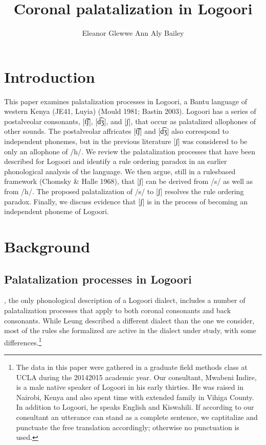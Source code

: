 \documentclass[output=paper]{langsci/langscibook}
\title{Coronal palatalization in Logoori}
\author{%
 Eleanor Glewwe\affiliation{University of California, Los Angeles}\lastand 
 Ann Aly Bailey \affiliation{University of California, Los Angeles}
}
\begin{document}
 



\section{Introduction}

This paper examines palatalization processes in Logoori, a Bantu language of western Kenya (JE41, Luyia) (Mould 1981; Bastin 2003). Logoori has a series of postalveolar consonants, [t͡ʃ], [d͡ʒ], and [ʃ], that occur as palatalized allophones of other sounds. The postalveolar affricates [t͡ʃ] and [d͡ʒ] also correspond to independent phonemes, but in the previous literature [ʃ] was considered to be only an allophone of /h/. We review the palatalization processes that have been described for Logoori and identify a rule ordering paradox in an earlier phonological analysis of the language. We then argue, still in a rulesbased framework (Chomsky \& Halle 1968), that [ʃ] can be derived from /s/ as well as from /h/. The proposed palatalization of /s/ to [ʃ] resolves the rule ordering paradox. Finally, we discuss evidence that [ʃ] is in the process of becoming an independent phoneme of Logoori.

\section{Background}
\subsection{Palatalization processes in Logoori} %

\citet{Leung1991}, the only phonological description of a Logoori dialect, includes a number of palatalization processes that apply to both coronal consonants and back consonants. While Leung described a different dialect than the one we consider, most of the rules she formalized are active in the dialect under study, with some differences.\footnote{   The data in this paper were gathered in a graduate field methods class at UCLA during the 20142015 academic year. Our consultant, Mwabeni Indire, is a male native speaker of Logoori in his early thirties. He was raised in Nairobi, Kenya and also spent time with extended family in Vihiga County. In addition to Logoori, he speaks English and Kiswahili. If according to our consultant an utterance can stand as a complete sentence, we captitalize and punctuate the free translation accordingly; otherwise no punctuation is used.} 
\end{document}
